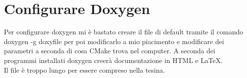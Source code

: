 \section{Configurare Doxygen}
Per configurare doxygen mi è bastato creare il file di default tramite il comando doxygen -g doxyfile per poi modificarlo a mio piacimento e modificare dei parametri a seconda di cosa CMake trova nel computer. A seconda dei programmi installati doxygen creerà documentazione in HTML e \LaTeX{}.\\
Il file è troppo lungo per essere compreso nella tesina.